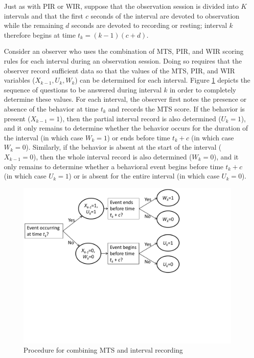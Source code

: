 \documentclass[man, noextraspace, floatsintext]{apa6}\usepackage[]{graphicx}\usepackage[]{color}
\begin{document}
Just as with PIR or WIR, suppose that the observation session is divided into $K$ intervals and that the first $c$ seconds of the interval are devoted to observation while the remaining $d$ seconds are devoted to recording or resting; interval $k$ therefore begins at time $t_k = (k - 1)(c + d)$. 

Consider an observer who uses the combination of MTS, PIR, and WIR scoring rules for each interval during an observation session. 
Doing so requires that the observer record sufficient data so that the values of the MTS, PIR, and WIR variables ($X_{k-1},U_k,W_k$) can be determined for each interval. 
Figure \ref{fig:questions} depicts the sequence of questions to be answered during interval $k$ in order to completely determine these values. 
For each interval, the observer first notes the presence or absence of the behavior at time $t_k$ and records the MTS score. 
If the behavior is present ($X_{k-1} = 1$), then the partial interval record is also determined ($U_k = 1$), and it only remains to determine whether the behavior occurs for the duration of the interval (in which case $W_k = 1$) or ends before time $t_k + c$ (in which case $W_k = 0$). 
Similarly, if the behavior is absent at the start of the interval ($X_{k-1} = 0$), then the whole interval record is also determined ($W_k = 0$), and it only remains to determine whether a behavioral event begins before time $t_k + c$ (in which case $U_k = 1$) or is absent for the entire interval (in which case $U_k = 0$). 

\begin{figure}[tbp]
\centering
\includegraphics[clip=true, trim= 0 240 150 00, width=0.8\linewidth]{ppt/AIR_flowchart.pdf}
\caption{Procedure for combining MTS and interval recording}
\label{fig:questions}
\end{figure}  
\end{document}
